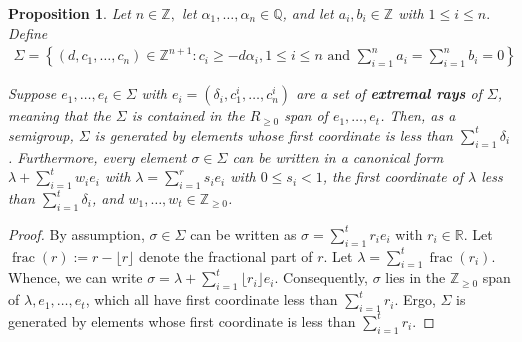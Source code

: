 \documentclass{amsart}
\theoremstyle{plain}
\newtheorem{prop}[thm]{Proposition}
\theoremstyle{definition}
\theoremstyle{remark}
\numberwithin{equation}{section}
\newcommand\br{{\mathbb R}}
\newcommand\bq{{\mathbb Q}}
\newcommand\bz{{\mathbb Z}}
\newcommand\pdeg{\delta}
\DeclareMathOperator{\fr}{frac}
\begin{document}
\begin{prop}
\label{prop:cone-generation}
Let $n \in \bz,$ let $\alpha_1, \ldots, \alpha_n \in \bq$, and let $a_i, b_i \in \bz$ with $1 \leq i \leq n.$ Define
\begin{align*}
	\Sigma = \left \{(d, c_1, \ldots, c_n) \in \bz^{n+1} : c_i \geq - d \alpha_i,1 \leq i \leq n \text{ and } \sum_{i=1}^{n}a_i = \sum_{i=1}^{n}b_i = 0 \right \}
\end{align*}

\noindent
Suppose $e_1, \ldots, e_t \in \Sigma$ with $e_i = (\pdeg_i, c_1^i,
\ldots, c_n^i)$ are a set of {\bf extremal rays} of $\Sigma$,
meaning that the $\Sigma$ is contained in the $R_{\geq 0}$ span of
$e_1, \ldots, e_t$.  Then, as a semigroup, $\Sigma$ is generated by
elements whose first coordinate is less than $\sum_{i = 1}^{t}
\pdeg_i$. Furthermore, every element $\sigma \in \Sigma$ can be
written in a canonical form $\lambda + \sum_{i = 1}^{t} w_i e_i$ 
with $\lambda = \sum_{i = 1}^{r} s_i e_i$ with $0 \leq s_i < 1$, the
first coordinate of $\lambda$ less than $\sum_{i=1}^{t}\pdeg_i$,
and $w_1, \ldots, w_t \in \bz_{\geq 0}$.
\end{prop}

\begin{proof}
By assumption, $\sigma \in \Sigma$ can be written as $\sigma = \sum_
{i = 1}^{t} r_i e_i$ with $r_i \in \br$. Let $\fr(r) := r - \lfloor r
\rfloor$ denote the fractional part of $r$. Let $\lambda = \sum_{i = 1}
^{t} \fr(r_i)$. Whence, we can write $\sigma = \lambda + \sum_{i = 1}
^{t} \lfloor r_i \rfloor e_i.$ Consequently, $\sigma$ lies in the
$\bz_{\geq 0}$ span of $\lambda, e_1, \ldots, e_t$, which all have
first coordinate less than $\sum_{i=1}^{t} r_i$. Ergo, $\Sigma$ is
generated by elements whose first coordinate is less than
$\sum_{i = 1}^{t} r_i$.
\end{proof}
\end{document}
